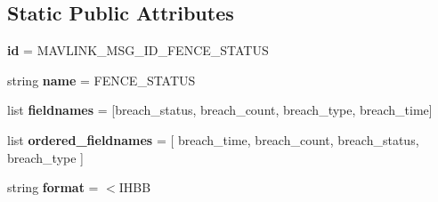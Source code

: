\subsection*{Static Public Attributes}
\begin{DoxyCompactItemize}
\item 
\mbox{\label{classpymavlink_1_1dialects_1_1v10_1_1MAVLink__fence__status__message_a72e4e0b265de11784a1a1c25ff5950e2}} 
{\bfseries id} = M\+A\+V\+L\+I\+N\+K\+\_\+\+M\+S\+G\+\_\+\+I\+D\+\_\+\+F\+E\+N\+C\+E\+\_\+\+S\+T\+A\+T\+US
\item 
\mbox{\label{classpymavlink_1_1dialects_1_1v10_1_1MAVLink__fence__status__message_a2d903a95517b70c9ee47ee26768118e3}} 
string {\bfseries name} = \textquotesingle{}F\+E\+N\+C\+E\+\_\+\+S\+T\+A\+T\+US\textquotesingle{}
\item 
\mbox{\label{classpymavlink_1_1dialects_1_1v10_1_1MAVLink__fence__status__message_af40843016bd9d19f067d06c90c67cd8d}} 
list {\bfseries fieldnames} = \mbox{[}\textquotesingle{}breach\+\_\+status\textquotesingle{}, \textquotesingle{}breach\+\_\+count\textquotesingle{}, \textquotesingle{}breach\+\_\+type\textquotesingle{}, \textquotesingle{}breach\+\_\+time\textquotesingle{}\mbox{]}
\item 
\mbox{\label{classpymavlink_1_1dialects_1_1v10_1_1MAVLink__fence__status__message_a01896e34d26d64de9ec5702d1650995f}} 
list {\bfseries ordered\+\_\+fieldnames} = \mbox{[} \textquotesingle{}breach\+\_\+time\textquotesingle{}, \textquotesingle{}breach\+\_\+count\textquotesingle{}, \textquotesingle{}breach\+\_\+status\textquotesingle{}, \textquotesingle{}breach\+\_\+type\textquotesingle{} \mbox{]}
\item 
\mbox{\label{classpymavlink_1_1dialects_1_1v10_1_1MAVLink__fence__status__message_a0931ddc6ab033337d18d76ecc0d2b54b}} 
string {\bfseries format} = \textquotesingle{}$<$I\+H\+BB\textquotesingle{}
\item 
\mbox{\label{classpymavlink_1_1dialects_1_1v10_1_1MAVLink__fence__status__message_a223e12ea8d5d1fa545dbf69caa749575}} 

\end{DoxyCompactItemize}
